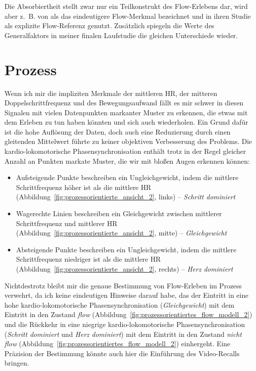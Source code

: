 Die Absorbiertheit stellt zwar nur ein Teilkonstrukt des Flow-Erlebens dar, wird aber z.~B. von \citet{Peifer2015} als das eindeutigere Flow-Merkmal bezeichnet und in ihren Studie als explizite Flow-Referenz genutzt. Zusätzlich spiegeln die Werte des Generalfaktors in meiner finalen Laufstudie die gleichen Unterschiede wieder. 



\section{Prozess} %
\label{sec:prozess}

Wenn ich mir die impliziten Merkmale der mittleren HR, der mitteren Doppelschrittfrequenz und des Bewegungsaufwand fällt es mir schwer in diesen Signalen mit vielen Datenpunkten markanter Muster zu erkennen, die etwas mit dem Erleben zu tun haben könnten und sich auch wiederholen. Ein Grund dafür ist die hohe Auflösung der Daten, doch auch eine Reduzierung durch einen gleitenden Mittelwert führte zu keiner objektiven Verbesserung des Problems. Die kardio-lokomotorische Phasensynchronisation enthält trotz in der Regel gleicher Anzahl an Punkten markate Muster, die wir mit bloßen Augen erkennen können:
\begin{itemize}

	\item Aufsteigende Punkte beschreiben ein Ungleichgewicht, indem die mittlere Schrittfrequenz höher ist als die mittlere \ac{HR} (Abbildung~\ref{fig:prozessorientierte_ansicht_2}, links) -- \emph{Schritt dominiert}
	
	\item Wagerechte Linien beschreiben ein Gleichgewicht zwischen mittlerer Schrittfrequenz und mittlerer \ac{HR} (Abbildung~\ref{fig:prozessorientierte_ansicht_2}, mitte) -- \emph{Gleichgewicht}
	
	\item Absteigende Punkte beschreiben ein Ungleichgewicht, indem die mittlere Schrittfrequenz niedriger ist als die mittlere \ac{HR} (Abbildung~\ref{fig:prozessorientierte_ansicht_2}, rechts) -- \emph{Herz dominiert} 

\end{itemize}

Nichtdestrotz bleibt mir die genaue Bestimmung von Flow-Erleben im Prozess verwehrt, da ich keine eindeutigen Hinweise darauf habe, das der Eintritt in eine hohe kardio-lokomotorische Phasensynchronisation (\emph{Gleichgewicht}) mit dem Eintritt in den Zustand \emph{flow} (Abbildung~\ref{fig:prozessorientiertes_flow_modell_2}) und die Rückkehr in eine niegrige kardio-lokomotorische Phasensynchronisation (\emph{Schritt dominiert} und \emph{Herz dominiert}) mit dem Eintritt in den Zustand \emph{nicht flow} (Abbildung~\ref{fig:prozessorientiertes_flow_modell_2}) einhergeht. Eine Präzision der Bestimmung könnte auch hier die Einführung des Video-Recalls bringen.

